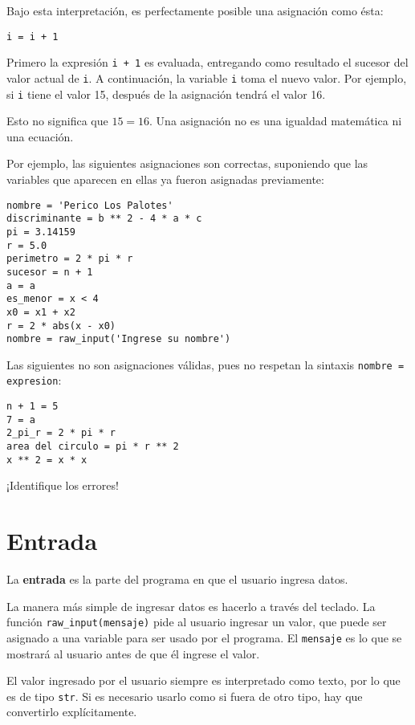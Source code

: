 Bajo esta interpretación, es perfectamente posible una asignación como
ésta:

\begin{lstlisting}
i = i + 1
\end{lstlisting}

Primero la expresión \lstinline!i + 1! es evaluada, entregando como
resultado el sucesor del valor actual de \lstinline!i!. A continuación,
la variable \lstinline!i! toma el nuevo valor. Por ejemplo, si
\lstinline!i! tiene el valor 15, después de la asignación tendrá el
valor 16.

Esto no significa que \(15 = 16\). Una asignación no es una igualdad
matemática ni una ecuación.

Por ejemplo, las siguientes asignaciones son correctas, suponiendo que
las variables que aparecen en ellas ya fueron asignadas previamente:

\begin{lstlisting}
nombre = 'Perico Los Palotes'
discriminante = b ** 2 - 4 * a * c
pi = 3.14159
r = 5.0
perimetro = 2 * pi * r
sucesor = n + 1
a = a
es_menor = x < 4
x0 = x1 + x2
r = 2 * abs(x - x0)
nombre = raw_input('Ingrese su nombre')
\end{lstlisting}

Las siguientes no son asignaciones válidas, pues no respetan la sintaxis
\lstinline!nombre = expresion!:

\begin{lstlisting}[language={}]
n + 1 = 5
7 = a
2_pi_r = 2 * pi * r
area del circulo = pi * r ** 2
x ** 2 = x * x
\end{lstlisting}

¡Identifique los errores!

\section{Entrada}

La \textbf{entrada} es la parte del programa en que el usuario ingresa
datos.

La manera más simple de ingresar datos es hacerlo a través del teclado.
La función \lstinline!raw_input(mensaje)! pide al usuario ingresar un
valor, que puede ser asignado a una variable para ser usado por el
programa. El \lstinline!mensaje! es lo que se mostrará al usuario antes
de que él ingrese el valor.

El valor ingresado por el usuario siempre es interpretado como texto,
por lo que es de tipo \lstinline!str!. Si es necesario usarlo como si
fuera de otro tipo, hay que convertirlo explícitamente.

